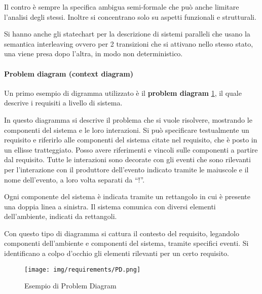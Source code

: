 Il contro è sempre la specifica ambigua semi-formale che può anche limitare l'analisi
degli stessi. Inoltre si concentrano solo su aspetti funzionali e strutturali.

Si hanno anche gli statechart per la descrizione di sistemi paralleli che usano
la semantica interleaving ovvero per 2 transizioni che si attivano nello stesso
stato, una viene presa dopo l'altra, in modo non deterministico.
\paragraph{Problem diagram (context diagram)}
Un primo esempio di digramma utilizzato è il \textbf{problem diagram}
\ref{fig:problemDiagram}, il quale
descrive i requisiti a livello di sistema.

In questo diagramma si descrive il problema che si vuole risolvere, mostrando le
componenti del sistema e le loro interazioni. Si può specificare testualmente un
requisito e riferirlo alle componenti del sistema citate nel requisito, che è
posto in un ellisse tratteggiato. Posso avere riferimenti e vincoli sulle
componenti a partire dal requisito. Tutte le interazioni sono decorate con gli
eventi che sono rilevanti per l'interazione con il produttore dell'evento indicato
tramite le maiuscole e il nome dell'evento, a loro volta separati da “!”.

Ogni componente del sistema è indicata tramite un rettangolo in cui è presente
una doppia linea a sinistra. Il sistema comunica con diversi elementi dell'ambiente,
indicati da rettangoli.

Con questo tipo di diagramma si cattura il contesto del requisito, legandolo
componenti dell'ambiente e componenti del sistema, tramite specifici eventi.
Si identificano a colpo d'occhio gli elementi rilevanti per un certo requisito.
\begin{figure}[!ht]
    \centering
    \texttt{[image: img/requirements/PD.png]}
    \caption{Esempio di Problem Diagram}
    \label{fig:problemDiagram}
\end{figure}


